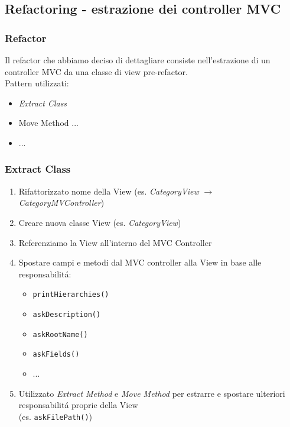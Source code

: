 \subsection{Refactoring - estrazione dei controller MVC}
\beamertitle
  \begin{frame}
      \frametitle{Refactor}
       Il refactor che abbiamo deciso di dettagliare consiste nell'estrazione di
       un controller MVC da una classe di view pre-refactor.
      \\
      \medskip
       Pattern utilizzati:
      \begin{itemize}
          \item \emph{Extract Class}
          \item Move Method ...
          \item ...
      \end{itemize}
  \end{frame}

\begin{frame}
    \frametitle{Extract Class}
    \begin{enumerate}
        \item Rifattorizzato nome della View (es. \emph{CategoryView} $\to$ \emph{CategoryMVController})
        \item Creare nuova classe View (es. \emph{CategoryView})
        \item Referenziamo la View all'interno del MVC Controller
        \item Spostare campi e metodi dal MVC controller alla View in base alle responsabilitá:
          \begin{itemize}
              \item \texttt{printHierarchies()}
              \item \texttt{askDescription()}
              \item \texttt{askRootName()}
              \item \texttt{askFields()}
              \item ...
          \end{itemize}
        \item Utilizzato \emph{Extract Method} e \emph{Move Method} per estrarre e spostare ulteriori responsabilitá proprie della View
              \\(es. \texttt{askFilePath()})
    \end{enumerate}
\end{frame}

